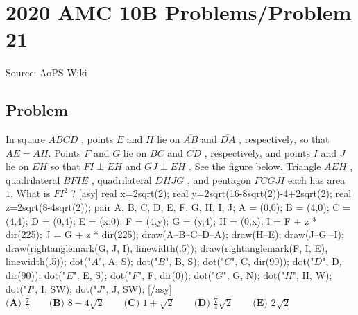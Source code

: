 \documentclass[12pt]{article}
\begin{document}
\section*{{2020 AMC 10B Problems/Problem 21}}
Source: AoPS Wiki

\subsection*{Problem}
In square $ABCD$ , points $E$ and $H$ lie on $\overline{AB}$ and $\overline{DA}$ , respectively, so that $AE=AH.$ Points $F$ and $G$ lie on $\overline{BC}$ and $\overline{CD}$ , respectively, and points $I$ and $J$ lie on $\overline{EH}$ so that $\overline{FI} \perp \overline{EH}$ and $\overline{GJ} \perp \overline{EH}$ . See the figure below. Triangle $AEH$ , quadrilateral $BFIE$ , quadrilateral $DHJG$ , and pentagon $FCGJI$ each has area $1.$ What is $FI^2$ ? [asy] real x=2sqrt(2); real y=2sqrt(16-8sqrt(2))-4+2sqrt(2); real z=2sqrt(8-4sqrt(2)); pair A, B, C, D, E, F, G, H, I, J; A = (0,0); B = (4,0); C = (4,4); D = (0,4); E = (x,0); F = (4,y); G = (y,4); H = (0,x); I = F + z * dir(225); J = G + z * dir(225); draw(A--B--C--D--A); draw(H--E); draw(J--G^^F--I); draw(rightanglemark(G, J, I), linewidth(.5)); draw(rightanglemark(F, I, E), linewidth(.5)); dot("$A$", A, S); dot("$B$", B, S); dot("$C$", C, dir(90)); dot("$D$", D, dir(90)); dot("$E$", E, S); dot("$F$", F, dir(0)); dot("$G$", G, N); dot("$H$", H, W); dot("$I$", I, SW); dot("$J$", J, SW); [/asy] $\textbf{(A) } \frac{7}{3} \qquad \textbf{(B) } 8-4\sqrt2 \qquad \textbf{(C) } 1+\sqrt2 \qquad \textbf{(D) } \frac{7}{4}\sqrt2 \qquad \textbf{(E) } 2\sqrt2$
\end{document}
